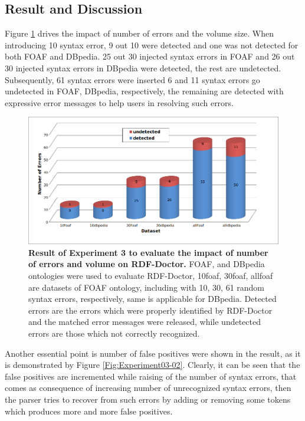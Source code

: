 \subsection{Result and Discussion}
Figure \ref{Fig:Experiment03-01} drives the impact of number of errors and the volume size. When introducing 10 syntax error, 9 out 10 were detected and one was not detected for both FOAF and DBpedia. 25 out 30 injected syntax errors in FOAF and 26 out 30 injected syntax errors in DBpedia were detected, the rest are undetected. Subsequently, 61 syntax errors were inserted 6 and 11 syntax errors go undetected in FOAF, DBpedia, respectively, the remaining are detected with expressive error messages to help users in resolving such errors. 
\begin{figure}[ht]
\begin{center}
		\includegraphics[scale=0.45,angle=0]{images/Experiment03-01.png}
				\setlength\belowcaptionskip{-5mm}

		\caption{\textbf{Result of Experiment 3 to evaluate the impact of number of errors and volume on RDF-Doctor.} FOAF, and DBpedia ontologies were used to evaluate RDF-Doctor, 10foaf, 30foaf, allfoaf are datasets of FOAF ontology, including with 10, 30, 61 random syntax errors, respectively, same is applicable for DBpedia. Detected errors are the errors which were properly identified by RDF-Doctor and the matched error messages were released, while undetected errors are those which not correctly recognized.}
		\label{Fig:Experiment03-01}

\end{center}
\end{figure}


Another essential point is number of false positives were shown in the result, as it is demonstrated  by Figure \ref{Fig:Experiment03-02}. Clearly, it can be seen that the false positives  are incremented while raising of the number of syntax errors, that comes as consequence of increasing number of unrecognized syntax errors, then the parser tries to recover from such errors by adding or removing some tokens which produces more and more false positives.   




